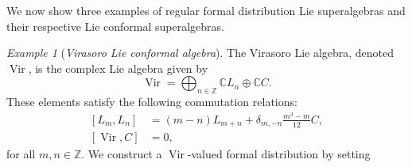 \documentclass[a4paper, 12pt, reqno]{amsart}
\theoremstyle{remark}
\newtheorem{example}[theorem]{Example}
\numberwithin{equation}{subsection}
\DeclareMathOperator{\Vir}{Vir}
\begin{document}
We now show three examples of regular formal distribution Lie superalgebras and their respective Lie conformal superalgebras.

\begin{example}[\emph{Virasoro Lie conformal algebra}]
  \label{exa:1}
  The Virasoro Lie algebra, denoted $\Vir$, is the complex Lie algebra given by
  \begin{equation*}
    \Vir = \bigoplus_{n \in \mathbb{Z}}\mathbb{C}L_{n} \oplus \mathbb{C}C.
  \end{equation*}
  These elements satisfy the following commutation relations:
  \begin{equation}
    \label{eq:6}
    \begin{aligned}
      [L_m, L_n] &= (m - n)L_{m + n} + \delta_{m, -n}\frac{m^3 - m}{12}C, \\
      [\Vir, C] &= 0,
    \end{aligned}
  \end{equation}
  for all $m, n \in \mathbb{Z}$.
  We construct a $\Vir$-valued formal distribution by setting
  

\end{example}
\end{document}
